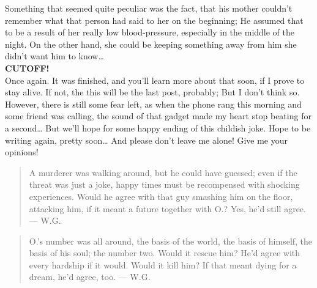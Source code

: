 Something that seemed quite peculiar was the fact, that his mother couldn't remember what that person had said to her on the beginning; He assumed that to be a result of her really low blood-pressure, especially in the middle of the night. On the other hand, she could be keeping something away from him she didn't want him to know\ldots\\
\textbf{CUTOFF!}\\
Once again. 
It was finished, and you'll learn more about that soon, if I prove to stay alive. If not, the this will be the last post, probably; But I don't think so. 
However, there is still some fear left, as when the phone rang this morning and some friend was calling, the sound of that gadget made my heart stop beating for a second\ldots
But we'll hope for some happy ending of this childish joke. 
Hope to be writing again, pretty soon\ldots
And please don't leave me alone!
Give me your opinions!

\begin{verse}
A murderer was walking around, 
but he could have guessed; 
even if the threat was just a joke, 
happy times must be recompensed 
with shocking experiences. 
Would he agree with that guy 
smashing him on the floor, 
attacking him, 
if it meant a future together with O.? 
Yes, he'd still agree. 
--- W.G.
\end{verse}

\begin{verse}
O.'s number was all around, 
the basis of the world, 
the basis of himself, 
the basis of his soul; 
the number two. 
Would it rescue him? 
He'd agree with every hardship if it would. 
Would it kill him? 
If that meant dying for a dream, 
he'd agree, too. 
--- W.G.
\end{verse}

